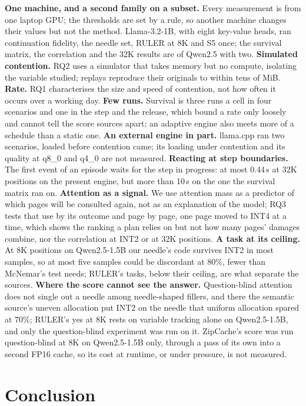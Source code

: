 \documentclass{article}
\begin{document}
\textbf{One machine, and a second family on a subset.} Every measurement is from
one laptop GPU; the thresholds are set by a rule, so another machine changes their
values but not the method. Llama-3.2-1B, with eight key-value heads, ran continuation
fidelity, the needle set, RULER at 8K and S5 once; the survival matrix, the
correlation and the 32K results are of Qwen2.5 with two.
\textbf{Simulated contention.} RQ2 uses a simulator that takes memory but no
compute, isolating the variable studied; replays reproduce their originals to
within tens of MiB. \textbf{Rate.} RQ1 characterises the size and speed of
contention, not how often it occurs over a working day. \textbf{Few runs.}
Survival is three runs a cell in four scenarios and one in the step and the
release, which bound a rate only loosely and cannot tell the score sources
apart; an adaptive engine also meets more of a schedule than a static one.
\textbf{An external engine in part.} llama.cpp ran two scenarios, loaded before
contention came; its loading under contention and its quality at q8\_0 and q4\_0
are not measured. \textbf{Reacting at step boundaries.} The first event of an
episode waits for the step in progress: at most 0.44\,s at 32K positions on the
present engine, but more than 10\,s on the one the survival matrix ran on. \textbf{Attention as a
signal.} We use attention mass as a predictor of which pages will be consulted
again, not as an explanation of the model; RQ3 tests that use by its outcome
and page by page, one page moved to INT4 at a time, which shows the ranking a
plan relies on but not how many pages' damages combine, nor the correlation at
INT2 or at 32K positions. \textbf{A task at its ceiling.} At 8K positions on
Qwen2.5-1.5B our needle's code survives INT2 in most samples, so at most five
samples could be discordant at 80\%, fewer than McNemar's test needs; RULER's
tasks, below their ceiling, are what separate the sources. \textbf{Where the
score cannot see the answer.} Question-blind attention does not single out a
needle among needle-shaped fillers, and there the semantic source's uneven
allocation put INT2 on the needle that uniform allocation spared at 70\%;
RULER's yes at 8K rests on variable tracking alone on Qwen2.5-1.5B, and only the
question-blind experiment was run on it. ZipCache's score was run question-blind
at 8K on Qwen2.5-1.5B only, through a pass of its own into a second FP16 cache,
so its cost at runtime, or under pressure, is not measured.

\section{Conclusion}
\label{sec:conclusion}
\end{document}
